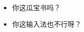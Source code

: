 \documentclass{ctexbeamer}
\begin{document}
	\begin{frame}
		\begin{itemize}
			\item 你这瓜宝书吗？
			\item 你这输入法也不行呀？
		\end{itemize}
	\end{frame}
	
	
\end{document}

